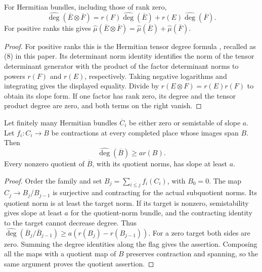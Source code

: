 \begin{lemma}
\label{lem:induction-tensor-degree}
\leanok
For Hermitian bundles, including those of rank zero,
\[
 \widehat{\deg}(\overline E\otimes\overline F)
 =r(F)\widehat{\deg}(\overline E)+r(E)\widehat{\deg}(\overline F).
\]
For positive ranks this gives
$\widehat\mu(\overline E\otimes\overline F)
=\widehat\mu(\overline E)+\widehat\mu(\overline F)$.
\end{lemma}
\begin{proof}
For positive ranks this is the Hermitian tensor degree formula
\cite[Proposition 4.3.19, equation (4.35)]{chenmoriwaki2020}, recalled as
(8) in this paper. Its determinant norm identity identifies the norm of
the tensor determinant generator with the product of the factor
determinant norms to powers $r(F)$ and $r(E)$, respectively. Taking
negative logarithms and integrating gives the displayed equality.
Divide by $r(E\otimes F)=r(E)r(F)$ to obtain its slope form.
If one factor has rank zero, its degree and the tensor product degree
are zero, and both terms on the right vanish.
\end{proof}

\begin{lemma}
\label{lem:finite-contracting-images}
\leanok
Let finitely many Hermitian bundles $\overline C_i$ be either zero or
semistable of slope $a$. Let $f_i:C_i\to B$ be contractions at every
completed place whose images span $B$. Then
\[
 \widehat{\deg}(\overline B)\ge a r(B).
\]
Every nonzero quotient of $\overline B$, with its quotient norms, has
slope at least $a$.
\end{lemma}
\begin{proof}
Order the family and set $B_j=\sum_{i\le j}f_i(C_i)$, with $B_0=0$.
The map $C_j\to B_j/B_{j-1}$ is surjective and contracting for the actual
subquotient norms. Its quotient norm is at least the target norm.
If its target is nonzero, semistability gives slope at least $a$ for
the quotient-norm bundle, and the contracting identity to the target
cannot decrease degree. Thus
$\widehat{\deg}(\overline B_j/\overline B_{j-1})\ge
a(r(B_j)-r(B_{j-1}))$. For a zero target both sides are zero.
Summing the degree identities along the flag gives the assertion.
Composing all the maps with a quotient map of $B$ preserves contraction
and spanning, so the same argument proves the quotient assertion.
\end{proof}

